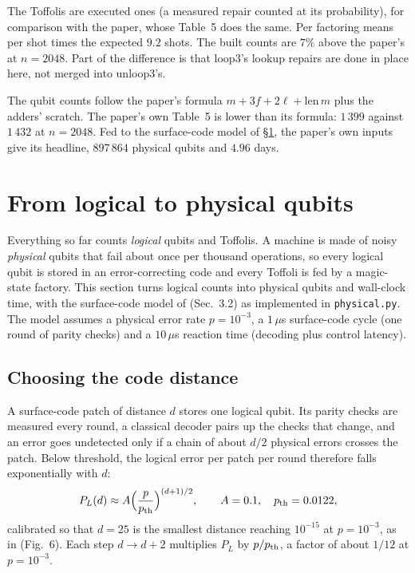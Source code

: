 \documentclass[11pt]{article}
\theoremstyle{plain}
\theoremstyle{remark}
\begin{document}
\noindent The Toffolis are executed ones (a measured repair counted at its probability), for
comparison with the paper, whose Table~5 does the same. Per factoring means per shot times the
expected $9.2$ shots. The built counts are $7\%$ above the paper's at $n=2048$.
Part of the difference is that loop3's lookup repairs are done in place here, not merged into
unloop3's.

The qubit counts follow the paper's formula $m+3f+2\ell+\mathrm{len}\,m$ plus the adders'
scratch. The paper's own Table~5 is lower than its formula: $1\,399$ against
$1\,432$ at $n=2048$. Fed to the surface-code model of \S\ref{rsa:sec:phys}, the paper's own inputs give its
headline, $897\,864$ physical qubits and $4.96$ days.

\section{From logical to physical qubits}\label{rsa:sec:phys}

Everything so far counts \emph{logical} qubits and Toffolis. A machine is made of noisy
\emph{physical} qubits that fail about once per thousand operations, so every logical qubit is stored
in an error-correcting code and every Toffoli is fed by a magic-state factory. This section turns
logical counts into physical qubits and wall-clock time, with the surface-code model of
\cite{ec:gidney25rsa} (Sec.~3.2) as implemented in \texttt{physical.py}. The model assumes a
physical error rate $p=10^{-3}$, a $1\,\mu$s surface-code cycle (one round of parity checks) and a
$10\,\mu$s reaction time (decoding plus control latency).

\subsection{Choosing the code distance}

A surface-code patch of distance $d$ stores one logical qubit. Its parity checks are measured every
round, a classical decoder pairs up the checks that change, and an error goes undetected only if a
chain of about $d/2$ physical errors crosses the patch. Below threshold, the logical error per patch
per round therefore falls exponentially with $d$:
\[ P_L(d)\approx A\Big(\frac{p}{p_{\rm th}}\Big)^{(d+1)/2},\qquad A=0.1,\quad p_{\rm th}=0.0122 , \]
calibrated so that $d=25$ is the smallest distance reaching $10^{-15}$ at $p=10^{-3}$, as in
\cite{ec:gidney25rsa} (Fig.~6). Each step $d\to d+2$ multiplies $P_L$ by $p/p_{\rm th}$, a factor
of about $1/12$ at $p=10^{-3}$.
\end{document}
